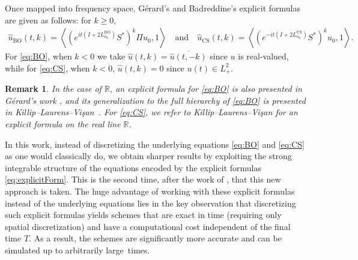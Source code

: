 \documentclass [11pt] {article}
\newtheorem{rem}[thm]{Remark}
\newcommand{\<}{\langle}
\renewcommand{\>}{\rangle}
\begin{document}
Once mapped into frequency space, Gérard's \cite{G} and  Badreddine's \cite{Badreddine24} explicit formulas are given as follows: for $k \ge 0$,
\begin{align}\label{eq:explicitForm}
\widehat{u}_{\text{BO}}(t,k) =\left\langle (e^{it(I+2L_{u_0}^{\text{BO}})}S^{*})^k \Pi u_0, 1 \right\rangle \quad \text{and}\quad
\widehat{u}_{\text{CS}}(t,k) =\left\langle (e^{-it(I+2L_{u_0}^{\text{CS}})}S^{*})^k  u_0, 1 \right\rangle.
\end{align}
For \eqref{eq:BO}, when $k<0$ we take $\widehat{u}(t,k) = \overline{\widehat{u}(t,-k)}$ since $u$ is real-valued, while for \eqref{eq:CS}, when $k<0$, $\widehat{u}(t,k) = 0$ since $u(t) \in L^2_{+}$.

\begin{rem}
In the case of $\mathbb{R} $, an explicit formula for \eqref{eq:BO} is also presented in Gérard's work \cite{G}, and its generalization to the full hierarchy of \eqref{eq:BO} is presented in Killip--Laurens--Vi\c san~\cite{Killip24}. For \eqref{eq:CS}, we refer to Killip--Laurens--Vi\c san \cite{KLV25} for an explicit formula on the real line $\mathbb{R}$.
\end{rem}
\medskip

In this work, instead of discretizing the underlying equations \eqref{eq:BO} and \eqref{eq:CS} as one would classically do, we obtain sharper results by exploiting the strong integrable structure of the equations encoded by the explicit formulas \eqref{eq:explicitForm}. This is the second time, after the work of \cite{ABCD24}, that this new approach is taken. The huge advantage of working with these explicit formulas instead of the underlying equations lies in the key observation that discretizing such explicit formulas yields schemes that are exact in time (requiring only spatial discretization) and have a computational cost independent of the final time 
$T$. As a result, the schemes are significantly more accurate and can be simulated up to arbitrarily large~times.
\end{document}
